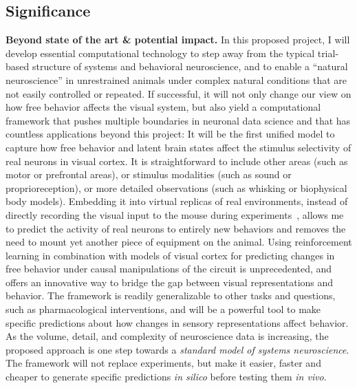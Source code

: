 \documentclass[COG,11pt]{ercgrant}
\begin{document}
\subsection{Significance}

\textbf{Beyond state of the art \& potential impact.} 
In this proposed project, I will develop essential computational technology to step away from the typical trial-based structure of systems and behavioral neuroscience, and to enable a ``natural neuroscience'' in unrestrained animals under complex natural conditions that are not easily controlled or repeated. 
If successful, it will not only change our view on how free behavior affects the visual system, but also yield a computational framework that pushes multiple boundaries in neuronal data science and that has countless applications beyond this project:
 It will be the first unified model to capture how free behavior and latent brain states affect the stimulus selectivity of real neurons in visual cortex. 
It is straightforward to include other areas (such as motor or prefrontal areas), or stimulus modalities (such as sound or proprioreception), or more detailed observations (such as whisking or biophysical body models). 
 Embedding it into virtual replicas of real environments, instead of directly recording the visual input to the mouse during experiments~\parencite{Parker2022-ac}, allows me to predict the activity of real neurons to entirely new behaviors and removes the need to mount yet another piece of equipment on the animal. 
 Using reinforcement learning in combination with models of visual cortex for predicting changes in free behavior under causal manipulations of the circuit is unprecedented, and offers an innovative way to bridge the gap between visual representations and behavior. 
The framework is readily generalizable to other tasks and questions, such as pharmacological interventions, and will be a powerful tool to make specific predictions about how changes in sensory representations affect behavior.
As the volume, detail, and complexity of neuroscience data is increasing, the proposed approach is one step towards a \textit{standard model of systems neuroscience}.
The framework will not replace experiments, but make it easier, faster and cheaper to generate specific predictions \textit{in silico} before testing them \textit{in vivo}.
\end{document}
